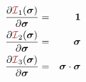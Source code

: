\begin{eqnarray}
\frac{\partial {\III}_1(\bm\sigma)}{\partial \bm\sigma} &=& {\bm 1} \\
\frac{\partial {\III}_2(\bm\sigma)}{\partial \bm\sigma} &=& {\bm \sigma} \\
\frac{\partial {\III}_3(\bm\sigma)}{\partial \bm\sigma} &=& \bm\sigma \cdot \bm\sigma
\end{eqnarray}



























